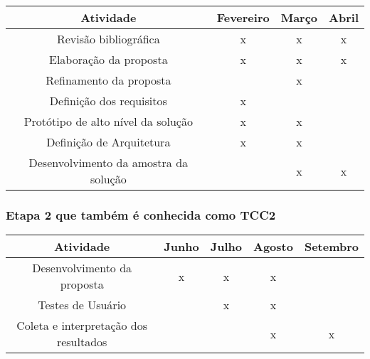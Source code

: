             \begin{center} 
                \begin{tabular}{ |c| c| c| c |}
                     \hline
                     Atividade & Fevereiro & Março & Abril \\
                     \hline
                     Revisão bibliográfica & x & x & x \\ 
                     \hline
                     Elaboração da proposta & x & x & x \\  
                     \hline
                     Refinamento da proposta &  & x &  \\
                     \hline
                     Definição dos requisitos & x &  & \\
                     \hline
                     Protótipo de alto nível da solução & x & x & \\
                     \hline
                     Definição de Arquitetura & x & x & \\
                     \hline
                     Desenvolvimento da amostra da solução  & & x & x \\
                     \hline
                     
                \end{tabular}
            \end{center}


        \subsubsection{Etapa 2 que também é conhecida como TCC2}
        
        \begin{center} 
            \begin{tabular}{ |c| c| c| c |c|}
                 \hline
                 Atividade & Junho  & Julho & Agosto & Setembro  \\
                 \hline
                 Desenvolvimento da proposta & x  & x  & x  &  \\ 
                 \hline
                 Testes de Usuário & & x & x & \\
                 \hline
                 Coleta e interpretação dos resultados & & & x & x \\
                 \hline
            \end{tabular}
        \end{center}
        
